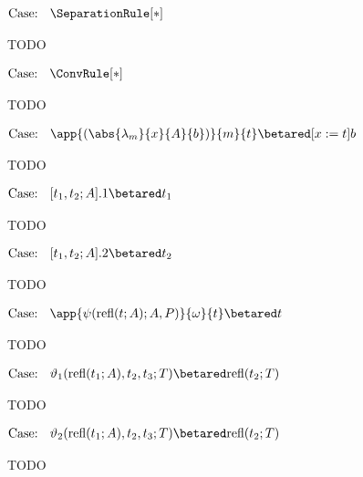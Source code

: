 $\text{Case: }\begin{array}{c} \SeparationRule[*] \end{array}$
\begin{proofcase}
    TODO
\end{proofcase}

$\text{Case: }\begin{array}{c} \ConvRule[*] \end{array}$
\begin{proofcase}
    TODO
\end{proofcase}



$\text{Case: }\begin{array}{c} \app{(\abs{\lambda_m}{x}{A}{b})}{m}{t} \betared [x := t]b \end{array}$
\begin{proofcase}
    TODO
\end{proofcase}

$\text{Case: }\begin{array}{c} [t_1, t_2; A].1 \betared t_1 \end{array}$
\begin{proofcase}
    TODO
\end{proofcase}

$\text{Case: }\begin{array}{c} [t_1, t_2; A].2 \betared t_2 \end{array}$
\begin{proofcase}
    TODO
\end{proofcase}

$\text{Case: }\begin{array}{c} \app{\psi(\text{refl}(t; A); A, P)}{\omega}{t} \betared t \end{array}$
\begin{proofcase}
    TODO
\end{proofcase}

$\text{Case: }\begin{array}{c} \vartheta_1(\text{refl}(t_1; A), t_2, t_3; T) \betared \text{refl}(t_2; T) \end{array}$
\begin{proofcase}
    TODO
\end{proofcase}

$\text{Case: }\begin{array}{c} \vartheta_2(\text{refl}(t_1; A), t_2, t_3; T) \betared \text{refl}(t_2; T) \end{array}$
\begin{proofcase}
    TODO
\end{proofcase}

